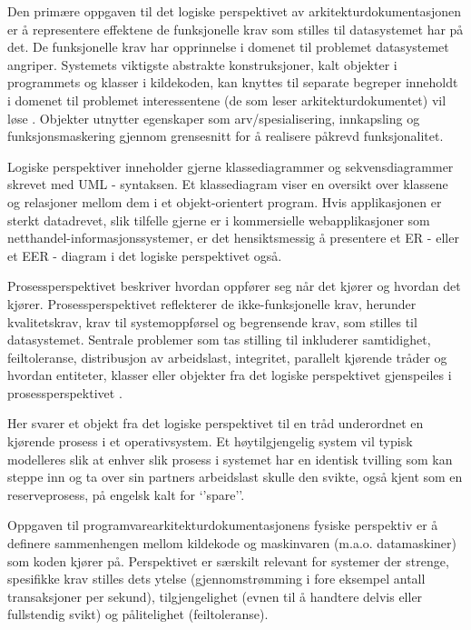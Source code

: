 Den primære oppgaven til det logiske perspektivet av arkitekturdokumentasjonen er å representere effektene de funksjonelle krav som stilles til datasystemet har på det. De funksjonelle krav har opprinnelse i domenet til problemet datasystemet angriper. Systemets viktigste abstrakte konstruksjoner, kalt objekter i programmets og klasser i kildekoden, kan knyttes til separate begreper inneholdt i domenet til problemet interessentene (de som leser arkitekturdokumentet) vil løse \citep{kruchten1995}. Objekter utnytter egenskaper som arv/spesialisering, innkapsling og funksjonsmaskering gjennom grensesnitt for å realisere påkrevd funksjonalitet.

Logiske perspektiver inneholder gjerne klassediagrammer og sekvensdiagrammer skrevet med UML - syntaksen. Et klassediagram viser en oversikt over klassene og relasjoner mellom dem i et objekt-orientert program. Hvis applikasjonen er sterkt datadrevet, slik tilfelle gjerne er i kommersielle webapplikasjoner som netthandel-informasjonssystemer, er det hensiktsmessig å presentere et ER -  eller et EER - diagram i det logiske perspektivet også.

Prosessperspektivet beskriver hvordan oppfører seg når det kjører og hvordan det kjører. Prosessperspektivet reflekterer de ikke-funksjonelle krav, herunder kvalitetskrav, krav til systemoppførsel og begrensende krav, som stilles til datasystemet. Sentrale problemer som tas stilling til inkluderer samtidighet, feiltoleranse, distribusjon av arbeidslast, integritet, parallelt kjørende tråder og hvordan entiteter, klasser eller objekter fra det logiske perspektivet gjenspeiles i prosessperspektivet \citep{kruchten1995}.

Her svarer et objekt fra det logiske perspektivet til en tråd underordnet en kjørende prosess i et operativsystem. Et høytilgjengelig system vil typisk modelleres slik at enhver slik prosess i systemet har en identisk tvilling som kan steppe inn og ta over sin partners arbeidslast skulle den svikte, også kjent som en reserveprosess, på engelsk kalt for ‘’spare’’.

Oppgaven til programvarearkitekturdokumentasjonens fysiske perspektiv er å definere sammenhengen mellom kildekode og maskinvaren (m.a.o. datamaskiner) som koden kjører på. Perspektivet er særskilt relevant for systemer der strenge, spesifikke krav stilles dets ytelse (gjennomstrømming i fore eksempel antall transaksjoner per sekund), tilgjengelighet (evnen til å handtere delvis eller fullstendig svikt) og pålitelighet (feiltoleranse).

